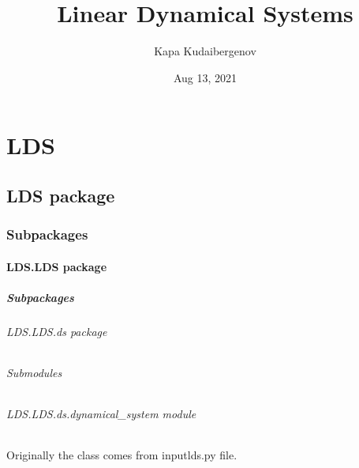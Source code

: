 \documentclass[letterpaper,10pt,english]{sphinxmanual}
\title{Linear Dynamical Systems}
\date{Aug 13, 2021}
\author{Kapa Kudaibergenov}
\begin{document}
\pagestyle{empty}
\sphinxmaketitle
\pagestyle{plain}
\sphinxtableofcontents
\pagestyle{normal}
\label{\detokenize{index::doc}}



\chapter{LDS}
\label{\detokenize{modules:lds}}\label{\detokenize{modules::doc}}

\section{LDS package}
\label{\detokenize{LDS:lds-package}}\label{\detokenize{LDS::doc}}

\subsection{Subpackages}
\label{\detokenize{LDS:subpackages}}

\subsubsection{LDS.LDS package}
\label{\detokenize{LDS.LDS:lds-lds-package}}\label{\detokenize{LDS.LDS::doc}}

\paragraph{Subpackages}
\label{\detokenize{LDS.LDS:subpackages}}

\subparagraph{LDS.LDS.ds package}
\label{\detokenize{LDS.LDS.ds:lds-lds-ds-package}}\label{\detokenize{LDS.LDS.ds::doc}}

\subparagraph{Submodules}
\label{\detokenize{LDS.LDS.ds:submodules}}

\subparagraph{LDS.LDS.ds.dynamical\_system module}
\label{\detokenize{LDS.LDS.ds:module-LDS.LDS.ds.dynamical_system}}\label{\detokenize{LDS.LDS.ds:lds-lds-ds-dynamical-system-module}}
\sphinxAtStartPar
Originally the class comes from inputlds.py file.
\end{document}

